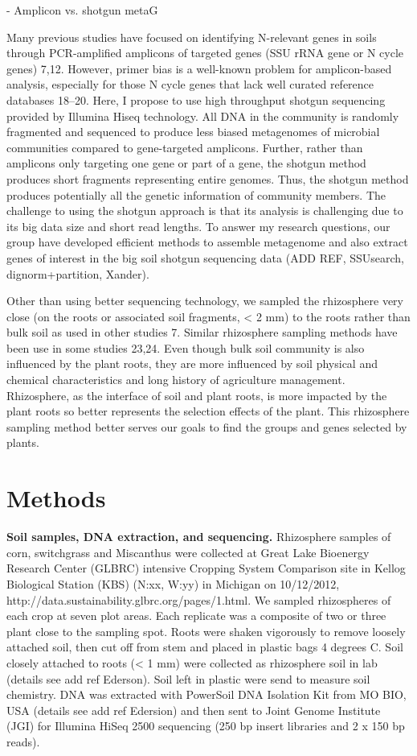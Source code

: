 \documentclass[12pt]{article}
\begin{document}
- Amplicon vs. shotgun metaG

Many previous studies have focused on identifying N-relevant genes in soils through PCR-amplified amplicons of targeted genes (SSU rRNA gene or N cycle genes) 7,12. However, primer bias is a well-known problem for amplicon-based analysis, especially for those N cycle genes that lack well curated reference databases 18–20. Here, I propose to use high throughput shotgun sequencing provided by Illumina Hiseq technology. All DNA in the community is randomly fragmented and sequenced to produce less biased metagenomes of microbial communities compared to gene-targeted amplicons. Further, rather than amplicons only targeting one gene or part of a gene, the shotgun method produces short fragments representing entire genomes. Thus, the shotgun method produces potentially all the genetic information of community members. The challenge to using the shotgun approach is that its analysis is challenging due to its big data size and short read lengths. To answer my research questions, our group have developed efficient methods to assemble metagenome and also extract genes of interest in the big soil shotgun sequencing data (ADD REF, SSUsearch, dignorm+partition, Xander).

Other than using better sequencing technology, we sampled the rhizosphere very close (on the roots or associated soil fragments, {\textless} 2 mm) to the roots rather than bulk soil as used in other studies 7. Similar rhizosphere sampling methods have been use in some studies 23,24. Even though bulk soil community is also influenced by the plant roots, they are more influenced by soil physical and chemical characteristics and long history of agriculture management. Rhizosphere, as the interface of soil and plant roots, is more impacted by the plant roots so better represents the selection effects of the plant. This rhizosphere sampling method better serves our goals to find the groups and genes selected by plants.

\section{Methods}

{\bf Soil samples, DNA extraction, and sequencing.}
Rhizosphere samples of corn, switchgrass and Miscanthus were collected at Great Lake Bioenergy Research Center (GLBRC) intensive Cropping System Comparison site in Kellog Biological Station (KBS) (N:xx, W:yy) in Michigan on 10/12/2012, http://data.sustainability.glbrc.org/pages/1.html. We sampled rhizospheres of each crop at seven plot areas. Each replicate was a composite of two or three plant close to the sampling spot. Roots were shaken vigorously to remove loosely attached soil, then cut off from stem and placed in plastic bags 4 degrees C. Soil closely attached to roots ({\textless} 1 mm) were collected as rhizosphere soil in lab (details see add ref Ederson). Soil left in plastic were send to measure soil chemistry. DNA was extracted with PowerSoil DNA Isolation Kit from MO BIO, USA (details see add ref Edersion) and then sent to Joint Genome Institute (JGI) for Illumina HiSeq 2500 sequencing (250 bp insert libraries and 2 x 150 bp reads).
\end{document}
